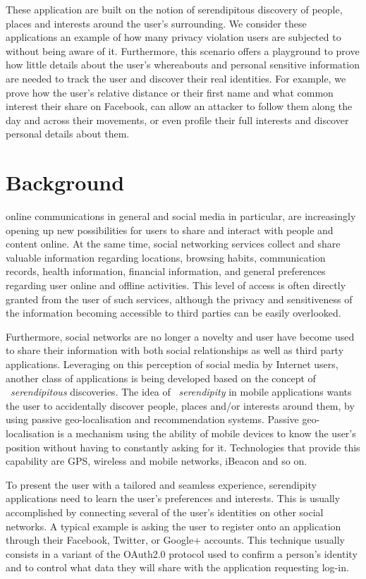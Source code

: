 These application are built on the notion of serendipitous discovery of people, places and interests around the user's surrounding.  We consider these applications an example of how many privacy violation users are subjected to without being aware of it. Furthermore, this scenario offers a playground to prove how little details about the user's whereabouts and personal sensitive information are needed to track the user and discover their real identities.  For example, we prove how the user's relative distance or their first name and what common interest their share on Facebook, can allow an attacker to follow them along the day and across their movements, or even profile their full interests and discover personal details about them.

\section{Background}
\noindent
online communications in general and social media in particular, are increasingly opening up new possibilities for users to share and interact with people and content online. At the same time, social networking services collect and share valuable information regarding locations, browsing habits, communication records, health information, financial information, and general preferences regarding user online and offline activities. This level of access is often directly granted from the user of such services, although the privacy and sensitiveness of the information becoming accessible to third parties can be easily overlooked.

Furthermore, social networks are no longer a novelty and user have become used to share their information with both social relationships as well as third party applications. Leveraging on this perception of social media by Internet users, another class of applications is being developed based on the concept of ~\emph{serendipitous} discoveries. The idea of ~\emph{serendipity} in mobile applications wants the user to accidentally discover people, places and/or interests around them, by using passive geo-localisation and recommendation systems. Passive geo-localisation is a mechanism using the ability of mobile devices to know the user's position without having to constantly asking for it. Technologies that provide this capability are GPS, wireless and mobile networks, iBeacon and so on.

To present the user with a tailored and seamless experience, serendipity applications need to learn the user's preferences and interests. This is usually accomplished by connecting several of the user's identities on other social networks. A typical example is asking the user to register onto an application through their Facebook, Twitter, or Google+ accounts. This technique usually consists in a variant of the OAuth2.0 protocol used to confirm a person's identity and to control what data they will share with the application requesting log-in.

